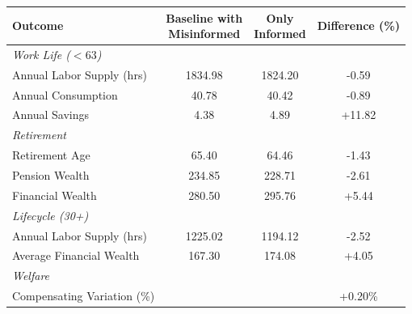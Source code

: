   \begin{tabular}{lccc}
    \toprule
    Outcome & \makecell{Baseline with \\ Misinformed} & \makecell{Only \\ Informed} & Difference (\%) \\
    \midrule
    \midrule
    \multicolumn{4}{l}{\textit{Work Life ($<63$)}} \\
    Annual Labor Supply (hrs) & 1834.98 & 1824.20 & -0.59 \\
    Annual Consumption & 40.78 & 40.42 & -0.89 \\
    Annual Savings & 4.38 & 4.89 & +11.82 \\
    \midrule
    \multicolumn{4}{l}{\textit{Retirement}} \\
    Retirement Age & 65.40 & 64.46 & -1.43 \\
    Pension Wealth & 234.85 & 228.71 & -2.61 \\
    Financial Wealth & 280.50 & 295.76 & +5.44 \\
    \midrule
    \multicolumn{4}{l}{\textit{Lifecycle (30+)}} \\
    Annual Labor Supply (hrs) & 1225.02 & 1194.12 & -2.52 \\
    Average Financial Wealth & 167.30 & 174.08 & +4.05 \\
    \midrule
    \multicolumn{4}{l}{\textit{Welfare}} \\
    Compensating Variation (\%) & & & +0.20\% \\
    \bottomrule
  \end{tabular}

